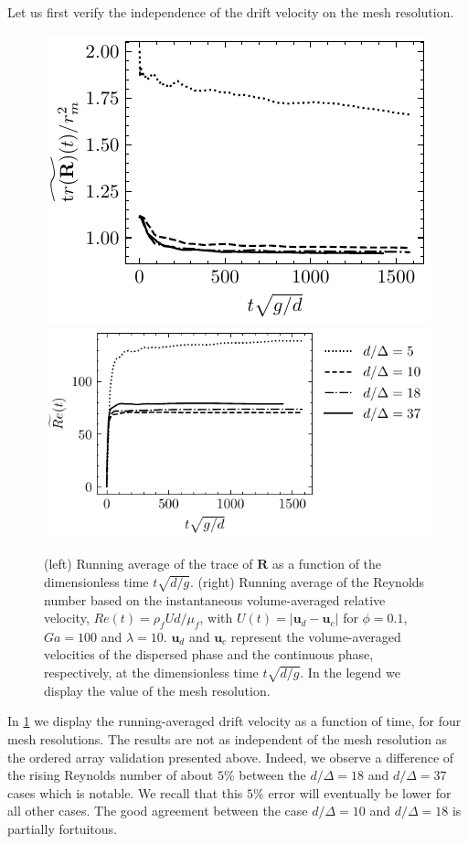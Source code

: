 Let us first verify the independence of the drift velocity on the mesh resolution. 
\begin{figure}[h!]
    \centering
    \includegraphics[height = 0.3\textwidth]{image/HOMOGENEOUS_NEW/VAL/tr.pdf}
    \includegraphics[height = 0.3\textwidth]{image/HOMOGENEOUS_NEW/VAL/Re.pdf}
    \caption{
        (left) Running average of the trace of $\textbf{R}$ as a function of the dimensionless time $t \sqrt{d/g}$. 
        (right) Running average of the Reynolds number based on the instantaneous volume-averaged relative velocity, $Re(t) = \rho_f U d /\mu_f$, with $U(t) = |\textbf{u}_d - \textbf{u}_c|$ for $\phi = 0.1$, $Ga=100$ and $\lambda =10$. 
        $\textbf{u}_d$ and $\textbf{u}_c$ represent the volume-averaged velocities of the dispersed phase and the continuous phase, respectively, at the dimensionless time $t \sqrt{d/g}$.
        In the legend we display the value of the mesh resolution. 
    }
    \label{fig:Re}
\end{figure}
In \ref{fig:Re} we display the running-averaged drift velocity as a function of time, for four mesh resolutions. 
The results are not as independent of the mesh resolution as the ordered array validation presented above. 
Indeed, we observe a difference of the rising Reynolds number of about $5\%$ between the $d/\Delta = 18$ and $d/\Delta = 37$ cases which is notable.
We recall that this $5\%$ error will eventually be lower for all other cases. 
The good agreement between the case  $d/\Delta = 10$ and $d/\Delta = 18$ is partially fortuitous.



